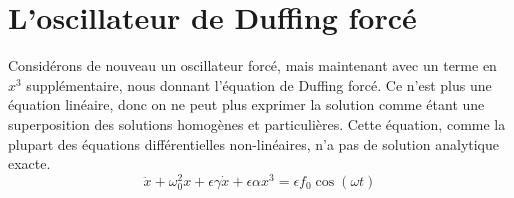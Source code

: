 \chapter{L'oscillateur de Duffing forcé}
%
Considérons de nouveau un oscillateur forcé, mais maintenant avec un terme en $x^3$ supplémentaire, nous donnant l'équation de Duffing forcé. Ce n'est plus une équation linéaire, donc on ne peut plus exprimer la solution comme étant une superposition des solutions homogènes et particulières. Cette équation, comme la plupart des équations différentielles non-linéaires, n'a pas de solution analytique exacte.
%
%
\begin{equation}
    \ddot{x} + \omega_0^2 x + \epsilon \gamma \dot{x} + \epsilon \alpha x^3 = \epsilon f_0 \cos(\omega t)
    \label{eq:duffing}
\end{equation}
%
